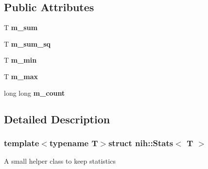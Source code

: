 \subsection*{\-Public \-Attributes}
\begin{DoxyCompactItemize}
\item 
\hypertarget{structnih_1_1_stats_aaa7459733553c60fc382e5cf23305b06}{
\-T {\bfseries m\-\_\-sum}}
\label{structnih_1_1_stats_aaa7459733553c60fc382e5cf23305b06}

\item 
\hypertarget{structnih_1_1_stats_a05c76d0946fc5c28e4811769d7a17f65}{
\-T {\bfseries m\-\_\-sum\-\_\-sq}}
\label{structnih_1_1_stats_a05c76d0946fc5c28e4811769d7a17f65}

\item 
\hypertarget{structnih_1_1_stats_afce3a72167740b7dfaa6ee0f6f3c755d}{
\-T {\bfseries m\-\_\-min}}
\label{structnih_1_1_stats_afce3a72167740b7dfaa6ee0f6f3c755d}

\item 
\hypertarget{structnih_1_1_stats_a19922155e335a5b13681240ba4b1cd2c}{
\-T {\bfseries m\-\_\-max}}
\label{structnih_1_1_stats_a19922155e335a5b13681240ba4b1cd2c}

\item 
\hypertarget{structnih_1_1_stats_a851a2f8c0ddd9ca0b515a3f84e940a79}{
long long {\bfseries m\-\_\-count}}
\label{structnih_1_1_stats_a851a2f8c0ddd9ca0b515a3f84e940a79}

\end{DoxyCompactItemize}


\subsection{\-Detailed \-Description}
\subsubsection*{template$<$typename \-T$>$struct nih\-::\-Stats$<$ T $>$}

\-A small helper class to keep statistics 

